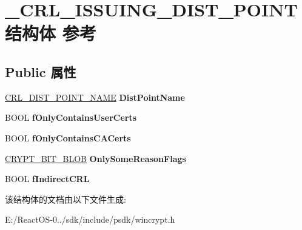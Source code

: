 \hypertarget{struct___c_r_l___i_s_s_u_i_n_g___d_i_s_t___p_o_i_n_t}{}\section{\+\_\+\+C\+R\+L\+\_\+\+I\+S\+S\+U\+I\+N\+G\+\_\+\+D\+I\+S\+T\+\_\+\+P\+O\+I\+N\+T结构体 参考}
\label{struct___c_r_l___i_s_s_u_i_n_g___d_i_s_t___p_o_i_n_t}
\subsection*{Public 属性}
\begin{DoxyCompactItemize}
\item 
\mbox{\label{struct___c_r_l___i_s_s_u_i_n_g___d_i_s_t___p_o_i_n_t_a000028258f9d08f55d6af21c695e2415}} 
\hyperlink{struct___c_r_l___d_i_s_t___p_o_i_n_t___n_a_m_e}{C\+R\+L\+\_\+\+D\+I\+S\+T\+\_\+\+P\+O\+I\+N\+T\+\_\+\+N\+A\+ME} {\bfseries Dist\+Point\+Name}
\item 
\mbox{\label{struct___c_r_l___i_s_s_u_i_n_g___d_i_s_t___p_o_i_n_t_a39339a5e1f1a55212b8d26a0312c4efb}} 
B\+O\+OL {\bfseries f\+Only\+Contains\+User\+Certs}
\item 
\mbox{\label{struct___c_r_l___i_s_s_u_i_n_g___d_i_s_t___p_o_i_n_t_a7494ff3167f4d1feeae28d3a8e0ecda8}} 
B\+O\+OL {\bfseries f\+Only\+Contains\+C\+A\+Certs}
\item 
\mbox{\label{struct___c_r_l___i_s_s_u_i_n_g___d_i_s_t___p_o_i_n_t_a4d6cf05cffe6553bec02f8773d37b0dd}} 
\hyperlink{struct___c_r_y_p_t___b_i_t___b_l_o_b}{C\+R\+Y\+P\+T\+\_\+\+B\+I\+T\+\_\+\+B\+L\+OB} {\bfseries Only\+Some\+Reason\+Flags}
\item 
\mbox{\label{struct___c_r_l___i_s_s_u_i_n_g___d_i_s_t___p_o_i_n_t_a26ca92c3e1ea441cfbfcb8c69ba9fdd4}} 
B\+O\+OL {\bfseries f\+Indirect\+C\+RL}
\end{DoxyCompactItemize}


该结构体的文档由以下文件生成\+:\begin{DoxyCompactItemize}
\item 
E\+:/\+React\+O\+S-\/0../sdk/include/psdk/wincrypt.\+h\end{DoxyCompactItemize}
